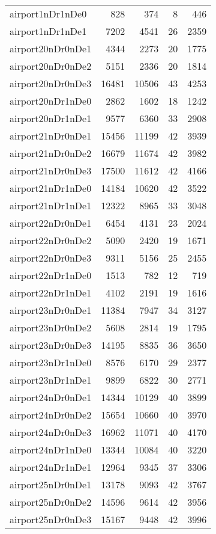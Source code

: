 \begin{tabular}{lrrrr}
airport1nDr1nDe0 & 828 & 374 & 8 & 446 \\
airport1nDr1nDe1 & 7202 & 4541 & 26 & 2359 \\
airport20nDr0nDe1 & 4344 & 2273 & 20 & 1775 \\
airport20nDr0nDe2 & 5151 & 2336 & 20 & 1814 \\
airport20nDr0nDe3 & 16481 & 10506 & 43 & 4253 \\
airport20nDr1nDe0 & 2862 & 1602 & 18 & 1242 \\
airport20nDr1nDe1 & 9577 & 6360 & 33 & 2908 \\
airport21nDr0nDe1 & 15456 & 11199 & 42 & 3939 \\
airport21nDr0nDe2 & 16679 & 11674 & 42 & 3982 \\
airport21nDr0nDe3 & 17500 & 11612 & 42 & 4166 \\
airport21nDr1nDe0 & 14184 & 10620 & 42 & 3522 \\
airport21nDr1nDe1 & 12322 & 8965 & 33 & 3048 \\
airport22nDr0nDe1 & 6454 & 4131 & 23 & 2024 \\
airport22nDr0nDe2 & 5090 & 2420 & 19 & 1671 \\
airport22nDr0nDe3 & 9311 & 5156 & 25 & 2455 \\
airport22nDr1nDe0 & 1513 & 782 & 12 & 719 \\
airport22nDr1nDe1 & 4102 & 2191 & 19 & 1616 \\
airport23nDr0nDe1 & 11384 & 7947 & 34 & 3127 \\
airport23nDr0nDe2 & 5608 & 2814 & 19 & 1795 \\
airport23nDr0nDe3 & 14195 & 8835 & 36 & 3650 \\
airport23nDr1nDe0 & 8576 & 6170 & 29 & 2377 \\
airport23nDr1nDe1 & 9899 & 6822 & 30 & 2771 \\
airport24nDr0nDe1 & 14344 & 10129 & 40 & 3899 \\
airport24nDr0nDe2 & 15654 & 10660 & 40 & 3970 \\
airport24nDr0nDe3 & 16962 & 11071 & 40 & 4170 \\
airport24nDr1nDe0 & 13344 & 10084 & 40 & 3220 \\
airport24nDr1nDe1 & 12964 & 9345 & 37 & 3306 \\
airport25nDr0nDe1 & 13178 & 9093 & 42 & 3767 \\
airport25nDr0nDe2 & 14596 & 9614 & 42 & 3956 \\
airport25nDr0nDe3 & 15167 & 9448 & 42 & 3996 \\

\end{tabular}
